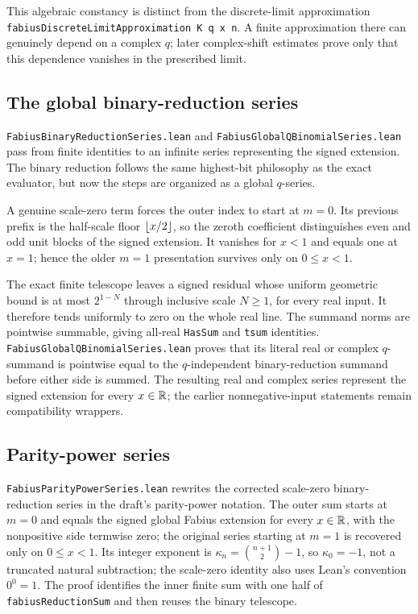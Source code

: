 \documentclass[11pt,oneside]{article}
\theoremstyle{definition}
\theoremstyle{remark}
\begin{document}
This algebraic constancy is distinct from the discrete-limit approximation \nolinkurl{fabiusDiscreteLimitApproximation K q x n}.  A finite approximation there can genuinely depend on a complex \(q\); later complex-shift estimates prove only that this dependence vanishes in the prescribed limit.

\subsection{The global binary-reduction series}
\nolinkurl{FabiusBinaryReductionSeries.lean} and \nolinkurl{FabiusGlobalQBinomialSeries.lean} pass from finite identities to an infinite series representing the signed extension.  The binary reduction follows the same highest-bit philosophy as the exact evaluator, but now the steps are organized as a global \(q\)-series.

A genuine scale-zero term forces the outer index to start at \(m=0\).  Its previous prefix is the half-scale floor \(\left\lfloor x/2\right\rfloor\), so the zeroth coefficient distinguishes even and odd unit blocks of the signed extension.  It vanishes for \(x<1\) and equals one at \(x=1\); hence the older \(m=1\) presentation survives only on \(0\leq x<1\).

The exact finite telescope leaves a signed residual whose uniform geometric
bound is at most \(2^{1-N}\) through inclusive scale \(N\geq1\), for every
real input.  It therefore tends uniformly to zero on the whole real line.
The summand norms are pointwise summable, giving all-real \nolinkurl{HasSum}
and \nolinkurl{tsum} identities.
\nolinkurl{FabiusGlobalQBinomialSeries.lean} proves that its literal real or complex
\(q\)-summand is pointwise equal to the \(q\)-independent binary-reduction
summand before either side is summed.  The resulting real and complex series
represent the signed extension for every \(x\in\mathbb{R}\); the earlier
nonnegative-input statements remain compatibility wrappers.

\subsection{Parity-power series}
\nolinkurl{FabiusParityPowerSeries.lean} rewrites the corrected scale-zero
binary-reduction series in the draft's parity-power notation.  The outer sum
starts at \(m=0\) and equals the signed global Fabius extension for every
\(x\in\mathbb{R}\), with the nonpositive side termwise zero; the original series
starting at \(m=1\) is recovered only on \(0\leq x<1\).  Its integer exponent
is \(\kappa_n=\binom{n+1}{2}-1\), so \(\kappa_0=-1\), not a truncated natural
subtraction; the scale-zero identity also uses Lean's convention \(0^0=1\).
The proof identifies the inner finite sum with one half of
\nolinkurl{fabiusReductionSum} and then reuses the binary telescope.
\end{document}
